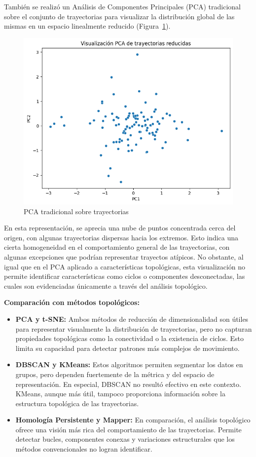 También se realizó un Análisis de Componentes Principales (PCA) tradicional sobre el conjunto de trayectorias para visualizar la distribución global de las mismas en un espacio linealmente reducido (Figura~\ref{fig:pca_tradicional}).

\begin{figure}[htbp]
    \centering
    \includegraphics[width=0.75\linewidth]{images/PCA_tradicional.png}
    \caption{PCA tradicional sobre trayectorias}
    \label{fig:pca_tradicional}
\end{figure}

En esta representación, se aprecia una nube de puntos concentrada cerca del origen, con algunas trayectorias dispersas hacia los extremos. Esto indica una cierta homogeneidad en el comportamiento general de las trayectorias, con algunas excepciones que podrían representar trayectos atípicos. No obstante, al igual que en el PCA aplicado a características topológicas, esta visualización no permite identificar características como ciclos o componentes desconectadas, las cuales son evidenciadas únicamente a través del análisis topológico.

\bigskip

\textbf{Comparación con métodos topológicos:}

\begin{itemize}
    \item \textbf{PCA y t-SNE:} Ambos métodos de reducción de dimensionalidad son útiles para representar visualmente la distribución de trayectorias, pero no capturan propiedades topológicas como la conectividad o la existencia de ciclos. Esto limita su capacidad para detectar patrones más complejos de movimiento.
    
    \item \textbf{DBSCAN y KMeans:} Estos algoritmos permiten segmentar los datos en grupos, pero dependen fuertemente de la métrica y del espacio de representación. En especial, DBSCAN no resultó efectivo en este contexto. KMeans, aunque más útil, tampoco proporciona información sobre la estructura topológica de las trayectorias.
    \item \textbf{Homología Persistente y Mapper:} En comparación, el análisis topológico ofrece una visión más rica del comportamiento de las trayectorias. Permite detectar bucles, componentes conexas y variaciones estructurales que los métodos convencionales no logran identificar.
\end{itemize}

